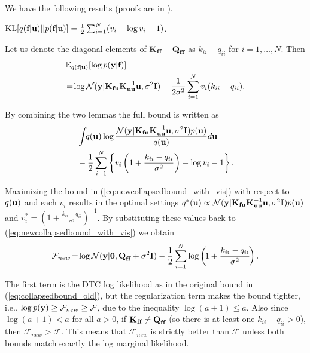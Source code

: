 We have the following results (proofs are in  ).
\begin{lemma}
\label{lem:KLqfupfu}
\emph{$\text{KL}[q(\textbf{f} | \textbf{u}) || p(\textbf{f} | \textbf{u})] 
= \frac{1}{2} \sum_{i=1}^N (v_i - \log v_i - 1)$}.
\end{lemma}
\begin{lemma} 
\label{lem:Expqfu_loglik}
Let us denote the diagonal elements of \emph{$\textbf{K}_{\textbf{f} \textbf{f}} - \textbf{Q}_{\textbf{f} \textbf{f}}$} as 
\emph{$k_{ii} - q_{ii}$} for \emph{$i=1,\ldots,N$}. Then  
\emph{\begin{align}
& \mathbb{E}_{q(\textbf{f} | \textbf{u})}[\log p(\textbf{y} | \textbf{f})] \nonumber \\ 
& \! = \! \log \mathcal{N}(\textbf{y} | \textbf{K}_{\textbf{f} \textbf{u}}
\textbf{K}_{\textbf{u} \textbf{u} }^{-1} \textbf{u}, \sigma^2 \textbf{I})
- \frac{1}{2 \sigma^2} 
\sum_{i=1}^N v_i (k_{ii} - q_{ii}). 
\end{align}}
\end{lemma}
By combining the two lemmas the full bound is written as 
\begin{align} 
& \int \! \!  q(\textbf{u}) \log \frac{  \mathcal{N}(\textbf{y} | \textbf{K}_{\textbf{f} \textbf{u}}
\textbf{K}_{\textbf{u} \textbf{u} }^{-1} \textbf{u}, \sigma^2 \textbf{I}) p(\textbf{u})}{q(\textbf{u})}  d \textbf{u} \nonumber \\
& - \frac{1}{2} 
\sum_{i=1}^N \left\{  v_i \left(1 + \frac{k_{ii} - q_{ii}}{\sigma^2}\right) - \log v_i -1 \right\}.  
\label{eq:newcollapsedbound_with_vis}
\end{align}
\begin{proposition}%
Maximizing the bound in (\ref{eq:newcollapsedbound_with_vis}) with respect to \emph{$q(\textbf{u})$}
and each \emph{$v_i$} results in the 
optimal settings \emph{$q^*(\textbf{u}) \propto  \mathcal{N}(\textbf{y} | \textbf{K}_{\textbf{f} \textbf{u}}
\textbf{K}_{\textbf{u} \textbf{u} }^{-1} \textbf{u}, \sigma^2 \textbf{I}) p(\textbf{u})$} and  
\emph{$v_i^* = \left(1 + \frac{k_{ii} - q_{ii}}{\sigma^2} \right)^{-1}$}. By substituting these values 
back to (\ref{eq:newcollapsedbound_with_vis}) we obtain
\emph{\begin{equation} 
\mathcal{F}_{new} \! = \! \log  \mathcal{N}(\textbf{y} |{\bf 0},   \textbf{Q}_{\textbf{f} \textbf{f}} + \sigma^2 \textbf{I}) 
 - \frac{1}{2}  
\sum_{i=1}^N \log \left(\! 1 + \frac{k_{ii} - q_{ii}}{\sigma^2} \! \right).   
\label{eq:newcollapsedbound}
\end{equation}
}
\label{prop:newbound}
\end{proposition}
The first term is the 
DTC log likelihood as in the original bound in (\ref{eq:collapsedbound_old}),  
but the regularization term 
makes the bound tighter, 
i.e., $\log p(\textbf{y}) \geq \mathcal{F}_{new} \geq \mathcal{F}$, due to the inequality $\log(a + 1) \leq a$. Also since $\log(a + 1) < a$ for all $a>0$, if $\textbf{K}_{\textbf{f} \textbf{f}} \neq \textbf{Q}_{\textbf{f} \textbf{f}}$ 
(so there is at least one $k_{ii} - q_{ii} > 0$), then $\mathcal{F}_{new} > \mathcal{F}$. This means that $\mathcal{F}_{new}$ is strictly better than $\mathcal{F}$ unless both bounds match exactly the log marginal likelihood. 


